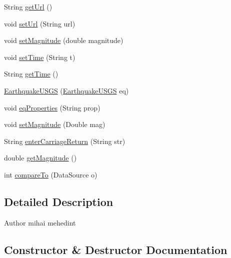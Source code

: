 \begin{DoxyCompactItemize}
String \hyperlink{classbridges_1_1data__src__dependent_1_1_earthquake_u_s_g_s_a2af3938390c31096329e635510df437e}{get\+Url} ()
\item 
void \hyperlink{classbridges_1_1data__src__dependent_1_1_earthquake_u_s_g_s_aaa9d26333e7b80d0f72da58ea2ad41d1}{set\+Url} (String url)
\item 
void \hyperlink{classbridges_1_1data__src__dependent_1_1_earthquake_u_s_g_s_ad7902d80cbbe11046858db1f2792e99d}{set\+Magnitude} (double magnitude)
\item 
void \hyperlink{classbridges_1_1data__src__dependent_1_1_earthquake_u_s_g_s_ae3813930d3468eff007521f33c8e2139}{set\+Time} (String t)
\item 
String \hyperlink{classbridges_1_1data__src__dependent_1_1_earthquake_u_s_g_s_a03397a4410818546c5232f46a3d4ffc4}{get\+Time} ()
\item 
\hyperlink{classbridges_1_1data__src__dependent_1_1_earthquake_u_s_g_s_a6b9281a299d6e60736355eb8833f9e0d}{Earthquake\+U\+S\+G\+S} (\hyperlink{classbridges_1_1data__src__dependent_1_1_earthquake_u_s_g_s}{Earthquake\+U\+S\+G\+S} eq)
\item 
void \hyperlink{classbridges_1_1data__src__dependent_1_1_earthquake_u_s_g_s_acc0ba6890ee5963f88a399523f009ae4}{eq\+Properties} (String prop)
\item 
void \hyperlink{classbridges_1_1data__src__dependent_1_1_earthquake_u_s_g_s_a34a4c6ebe01c5daa7c86b3a4207d633f}{set\+Magnitude} (Double mag)
\item 
String \hyperlink{classbridges_1_1data__src__dependent_1_1_earthquake_u_s_g_s_aade0ce9a2fee927b015f5eb495c481e1}{enter\+Carriage\+Return} (String str)
\item 
double \hyperlink{classbridges_1_1data__src__dependent_1_1_earthquake_u_s_g_s_a3ec5d753277d6287b222448ff2477291}{get\+Magnitude} ()
\item 
int \hyperlink{classbridges_1_1data__src__dependent_1_1_earthquake_u_s_g_s_a60cad0a286825f77cd2900265acae982}{compare\+To} (Data\+Source o)
\end{DoxyCompactItemize}


\subsection{Detailed Description}
\begin{DoxyAuthor}{Author}
mihai mehedint 
\end{DoxyAuthor}


\subsection{Constructor \& Destructor Documentation}
\hypertarget{classbridges_1_1data__src__dependent_1_1_earthquake_u_s_g_s_a1803f7d357ce045cefbc923e096e9646}{}
